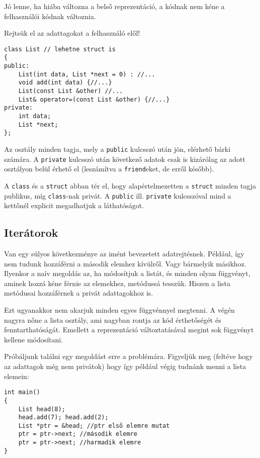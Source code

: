 \documentclass[a4paper,11.5pt,table]{article}
\begin{document}
	Jó lenne, ha hiába változna a belső reprezentáció, a kódnak nem kéne a felhasználói kódnak változnia. 
	
	Rejtsük el az adattagokat a felhasználó elől!

\begin{lstlisting}
class List // lehetne struct is
{
public:
	List(int data, List *next = 0) : //...
	void add(int data) {//...}
	List(const List &other) //...
	List& operator=(const List &other) {//...}
private:
	int data;
	List *next;
};
\end{lstlisting}
  Az osztály minden tagja, mely a \texttt{public} kulcsszó után jön, elérhető bárki számára. A \texttt{private} kulcsszó után következő adatok csak is kizárólag az adott osztályon belül érhető el (leszámítva a \texttt{friend}eket, de erről később).

	A \texttt{class} és a \texttt{struct} abban tér el, hogy alapértelmezetten a \texttt{struct} minden tagja publikus, míg \texttt{class}-nak privát. A \texttt{public} ill. \texttt{private} kulcsszóval mind a kettőnél explicit megadhatjuk a láthatóságot.
	\subsection{Iterátorok}
	Van egy súlyos következménye az imént bevezetett adatrejtésnek. Például, így nem tudunk hozzáférni a második elemhez kívülről. Vagy bármelyik másikhoz. Ilyenkor a naív megoldás az, ha módosítjuk a listát, és minden olyan függvényt, aminek hozzá kéne férnie az elemekhez, metódussá tesszük. Hiszen a lista metódusai hozzáférnek a privát adattagokhoz is.
	
	Ezt ugyanakkor nem akarjuk minden egyes függvénnyel megtenni. A végén nagyra nőne a lista osztály, ami nagyban rontja az kód érthetőségét és fenntarthatóságát. Emellett a reprezentáció változtatásával megint sok függvényt kellene módosítani.
	
	\medskip
	Próbáljunk találni egy megoldást erre a problémára. Figyeljük meg (feltéve hogy az adattagok még nem privátok) hogy így például végig tudnánk menni a lista elemein:
	\begin{lstlisting}
int main()
{
	List head(8);
	head.add(7); head.add(2);
	List *ptr = &head; //ptr első elemre mutat
	ptr = ptr->next; //második elemre
	ptr = ptr->next; //harmadik elemre
}
	\end{lstlisting}
	
\end{document}
